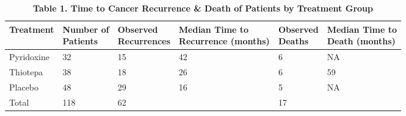 \documentclass{article}
\begin{document}
	\begin{table}[ht]
		\centering
		\footnotesize
		\caption*{\textbf{Table 1. Time to Cancer Recurrence \& Death of Patients by Treatment Group}}
		\begin{tabular}{@{}l l | l l | l l @{}}
			\toprule
			Treatment & \parbox[t]{2cm}{Number of\\ Patients} & \parbox[t]{2.5cm}{Observed\\ Recurrences} & \parbox[t]{3cm}{Median Time to\\ Recurrence (months)} & \parbox[t]{2.5cm}{Observed\\ Deaths} & \parbox[t]{3cm}{Median Time to\\ Death (months)} \\
			\midrule
			Pyridoxine & 32 & 15 & 42 & 6 & NA \\
			Thiotepa   & 38 & 18 & 26 & 6 & 59 \\
			Placebo    & 48 & 29 & 16 & 5 & NA \\
			\midrule
			Total      & 118 & 62 & & 17 & \\
			\bottomrule
		\end{tabular}
	\end{table}
\end{document}
